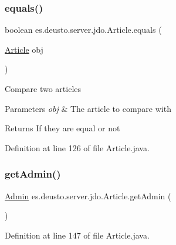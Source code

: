 \subsubsection{\texorpdfstring{equals()}{equals()}}
{\footnotesize\ttfamily boolean es.\+deusto.\+server.\+jdo.\+Article.\+equals (\begin{DoxyParamCaption}\item[{\hyperlink{classes_1_1deusto_1_1server_1_1jdo_1_1_article}{Article}}]{obj }\end{DoxyParamCaption})}

Compare two articles 
\begin{DoxyParams}{Parameters}
{\em obj} & The article to compare with \\
\hline
\end{DoxyParams}
\begin{DoxyReturn}{Returns}
If they are equal or not 
\end{DoxyReturn}


Definition at line 126 of file Article.\+java.

\mbox{\label{classes_1_1deusto_1_1server_1_1jdo_1_1_article_a61bf2e2f04b3bf40e2e85321efca5944}} 
\subsubsection{\texorpdfstring{get\+Admin()}{getAdmin()}}
{\footnotesize\ttfamily \hyperlink{classes_1_1deusto_1_1server_1_1jdo_1_1_admin}{Admin} es.\+deusto.\+server.\+jdo.\+Article.\+get\+Admin (\begin{DoxyParamCaption}{ }\end{DoxyParamCaption})}



Definition at line 147 of file Article.\+java.

\mbox{\label{classes_1_1deusto_1_1server_1_1jdo_1_1_article_a8fa1d3a79b76f42058e922c4e32fb197}} 
